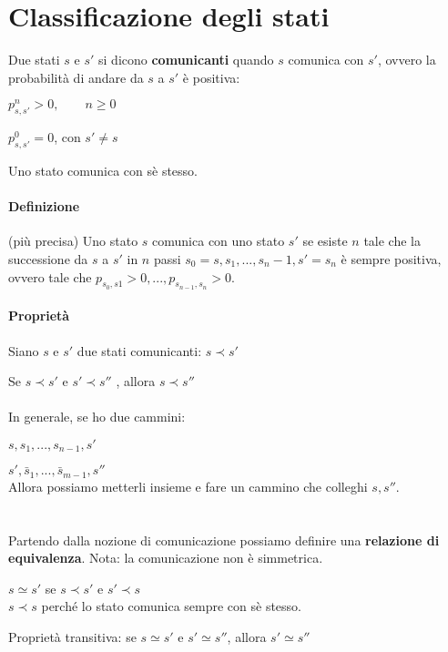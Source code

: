 \documentclass[a4paper,12pt]{book}
\begin{document}
\section{Classificazione degli stati}

Due stati $ s $ e $ s' $ si dicono \textbf{comunicanti} quando $ s $ comunica con $ s' $, ovvero la probabilità di andare da $ s $ a $ s' $ è positiva:

$ p^{n}_{s,s'} > 0, \qquad n \ge 0 $

$ p^0_{s,s'} = 0 $, con $ s' \ne s $


Uno stato comunica con sè stesso. 

\paragraph{Definizione} (più precisa) Uno stato $ s $ comunica con uno stato $ s' $ se esiste $ n $ tale che la successione da $ s $ a $ s' $ in $ n $ passi $ s_0 = s, s_1, ..., s_n-1,  s'  = s_n $ è sempre positiva, ovvero tale che $ p_{s_0, s1} > 0, ..., p_{s_{n-1}, s_n} > 0$. 

\paragraph{Proprietà} Siano $ s $ e $ s' $ due stati comunicanti: $ s \prec s' $

Se $ s \prec s' $ e $ s' \prec s'' $ 
, allora $ s \prec s'' $ \\
\\
In generale, se ho due cammini:

$ s, s_1, ..., s_{n-1}, s' $

$ s', \bar{s}_1, ..., \bar{s}_{m-1}, s'' $
\\
Allora possiamo metterli insieme e fare un cammino che colleghi $ s, s''$. \\
\\
\\
Partendo dalla nozione di comunicazione possiamo definire una \textbf{relazione di equivalenza}. Nota: la comunicazione non è simmetrica. 

$ s \simeq s' $ se $ s \prec s' $ e $ s' \prec s $
\\
$ s \prec s $ perché lo stato comunica sempre con sè stesso.

Proprietà transitiva: se $ s \simeq s' $ e $ s' \simeq s'' $, allora $ s' \simeq s'' $
\end{document}
